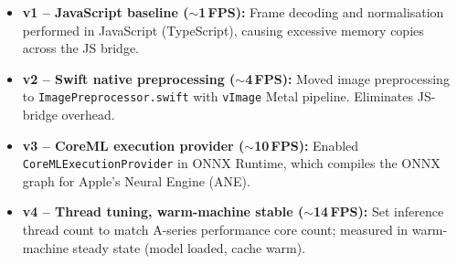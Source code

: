 \begin{itemize}[leftmargin=1.5em]
  \item \textbf{v1 -- JavaScript baseline ($\sim$1\,FPS):}
    Frame decoding and normalisation performed in JavaScript (TypeScript),
    causing excessive memory copies across the JS bridge.

  \item \textbf{v2 -- Swift native preprocessing ($\sim$4\,FPS):}
    Moved image preprocessing to \texttt{ImagePreprocessor.swift}
    with \texttt{vImage} Metal pipeline.  Eliminates JS-bridge overhead.

  \item \textbf{v3 -- CoreML execution provider ($\sim$10\,FPS):}
    Enabled \texttt{CoreMLExecutionProvider} in ONNX Runtime, which
    compiles the ONNX graph for Apple's Neural Engine (ANE).

  \item \textbf{v4 -- Thread tuning, warm-machine stable ($\sim$14\,FPS):}
    Set inference thread count to match A-series performance core count;
    measured in warm-machine steady state (model loaded, cache warm).
\end{itemize}
